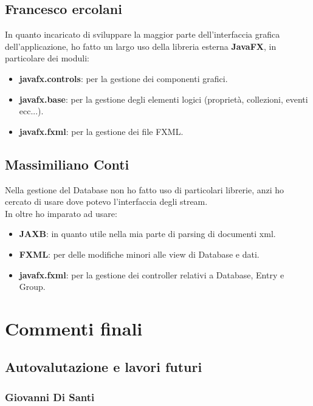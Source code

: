 \documentclass[a4paper,12pt]{report}
\begin{document}
\section*{Francesco ercolani}
In quanto incaricato di sviluppare la maggior parte dell'interfaccia grafica dell'applicazione, ho fatto un largo uso della libreria esterna \textbf{JavaFX}, in particolare dei moduli:
\begin{itemize}
    \item \textbf{javafx.controls}: per la gestione dei componenti grafici.
    \item \textbf{javafx.base}: per la gestione degli elementi logici (proprietà, collezioni, eventi ecc...).
    \item \textbf{javafx.fxml}: per la gestione dei file FXML.
\end{itemize}

\section*{Massimiliano Conti}
Nella gestione del Database non ho fatto uso di particolari librerie, anzi ho cercato di usare dove potevo l'interfaccia degli stream.\\
In oltre ho imparato ad usare:
\begin{itemize}
    \item \textbf{JAXB}: in quanto utile nella mia parte di parsing di documenti xml.
    \item \textbf{FXML}: per delle modifiche minori alle view di Database e dati.
    \item \textbf{javafx.fxml}: per la gestione dei controller relativi a Database, Entry e Group.
\end{itemize}

\chapter{Commenti finali}

\section{Autovalutazione e lavori futuri}

\subsection*{Giovanni Di Santi}
\end{document}
